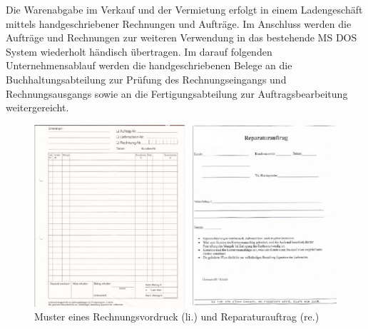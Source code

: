 Die Warenabgabe im Verkauf und der Vermietung erfolgt in einem Ladengeschäft mittels handgeschriebener Rechnungen und Aufträge. Im Anschluss werden die Aufträge und Rechnungen zur weiteren Verwendung in das bestehende MS DOS System wiederholt händisch übertragen. Im darauf folgenden Unternehmensablauf werden die handgeschriebenen Belege an die Buchhaltungsabteilung zur Prüfung des Rechnungseingangs und Rechnungsausgangs sowie an die Fertigungsabteilung zur Auftragsbearbeitung weitergereicht. \cite{einleitung1}
\begin{figure}[!ht]
    \centering
    \includegraphics{rechnungReparaturAlt2.png}
    \caption[Muster Rechnungsvordruck und Reparaturauftrag]{\small{Muster eines Rechnungsvordruck (li.) und Reparaturauftrag (re.) \cite{einleitung1}}}
    \label{fig:4}
\end{figure}